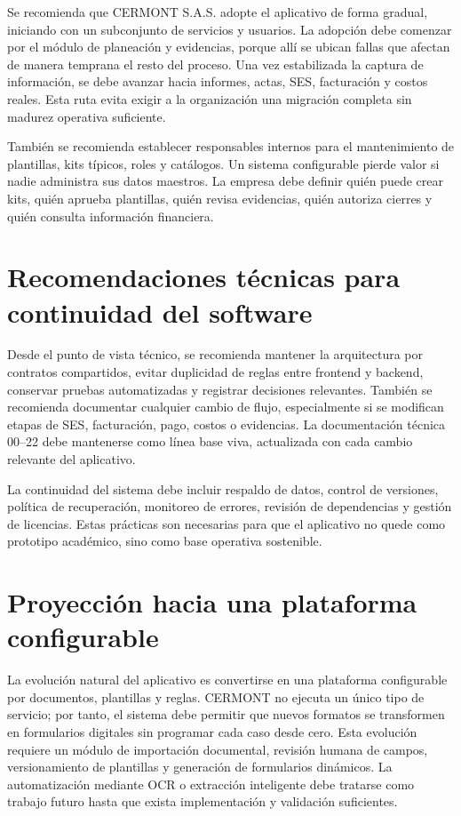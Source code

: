 Se recomienda que CERMONT S.A.S. adopte el aplicativo de forma gradual, iniciando con un subconjunto de servicios y usuarios. La adopción debe comenzar por el módulo de planeación y evidencias, porque allí se ubican fallas que afectan de manera temprana el resto del proceso. Una vez estabilizada la captura de información, se debe avanzar hacia informes, actas, SES, facturación y costos reales. Esta ruta evita exigir a la organización una migración completa sin madurez operativa suficiente.

También se recomienda establecer responsables internos para el mantenimiento de plantillas, kits típicos, roles y catálogos. Un sistema configurable pierde valor si nadie administra sus datos maestros. La empresa debe definir quién puede crear kits, quién aprueba plantillas, quién revisa evidencias, quién autoriza cierres y quién consulta información financiera.

\section{Recomendaciones técnicas para continuidad del software}
\label{sec:recomendaciones-tecnicas-continuidad}

Desde el punto de vista técnico, se recomienda mantener la arquitectura por contratos compartidos, evitar duplicidad de reglas entre frontend y backend, conservar pruebas automatizadas y registrar decisiones relevantes. También se recomienda documentar cualquier cambio de flujo, especialmente si se modifican etapas de SES, facturación, pago, costos o evidencias. La documentación técnica 00--22 debe mantenerse como línea base viva, actualizada con cada cambio relevante del aplicativo.

La continuidad del sistema debe incluir respaldo de datos, control de versiones, política de recuperación, monitoreo de errores, revisión de dependencias y gestión de licencias. Estas prácticas son necesarias para que el aplicativo no quede como prototipo académico, sino como base operativa sostenible.

\section{Proyección hacia una plataforma configurable}
\label{sec:proyeccion-plataforma-configurable}

La evolución natural del aplicativo es convertirse en una plataforma configurable por documentos, plantillas y reglas. CERMONT no ejecuta un único tipo de servicio; por tanto, el sistema debe permitir que nuevos formatos se transformen en formularios digitales sin programar cada caso desde cero. Esta evolución requiere un módulo de importación documental, revisión humana de campos, versionamiento de plantillas y generación de formularios dinámicos. La automatización mediante OCR o extracción inteligente debe tratarse como trabajo futuro hasta que exista implementación y validación suficientes.

